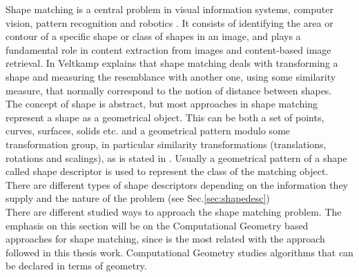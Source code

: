 Shape matching is a central problem in visual information systems,
computer vision, pattern recognition and robotics \cite{matchingbook}. 
It consists of identifying the area or contour of a specific
shape or class of shapes in an image, and plays a fundamental
role in content extraction from images and content-based image
retrieval. In \cite{matching2} Veltkamp explains that shape 
matching deals with transforming a shape and measuring the 
resemblance with another one, using some similarity measure, that 
normally correspond to the notion of distance between shapes.\\
The concept of shape is abstract, but most approaches in 
shape matching represent a shape as a geometrical object.
This can be both a set of points, curves, surfaces, solids etc.
and a geometrical pattern modulo some transformation group,
in particular similarity transformations (translations, rotations 
and scalings), as is stated in \cite{matching2}. Usually a
geometrical pattern of a shape called shape descriptor
is used to represent the class of the matching object. There are
different types of shape descriptors depending on the information
they supply and the nature of the problem (see Sec.\ref{sec:shapedesc}) \\

There are different studied ways to approach the shape matching 
problem. The emphasis on this section will be on the Computational
Geometry based approaches for shape matching, since is the most related with
the approach followed in this thesis work. Computational
Geometry studies algorithms that can be declared in terms of 
geometry.\\


